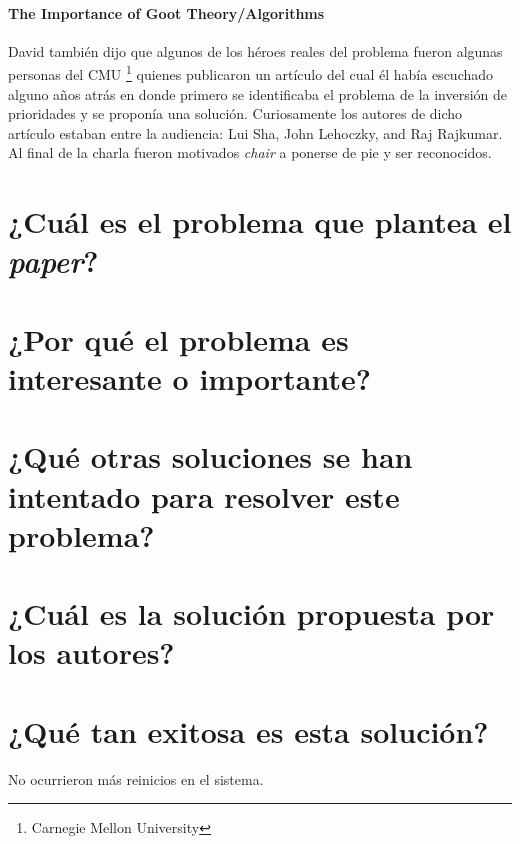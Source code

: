 \paragraph{\textnormal{\textbf{The Importance of Goot Theory/Algorithms}}}
David también dijo que algunos de los héroes reales del problema fueron algunas personas del CMU \footnote{Carnegie Mellon University} quienes publicaron un artículo del cual él había escuchado  alguno años atrás en donde primero se identificaba el problema de la inversión de prioridades y se proponía una solución. Curiosamente los autores de dicho artículo estaban entre la audiencia: Lui Sha, John Lehoczky, and Raj Rajkumar. Al final de la charla fueron motivados \textit{chair} a ponerse de pie y ser reconocidos.




\section{¿Cuál es el problema que plantea el \textit{paper}?}

\section{¿Por qué el problema es interesante o importante?}

\section{¿Qué otras soluciones se han intentado para resolver este problema?}
     
\section{¿Cuál es la solución propuesta por los autores?}

\section{¿Qué tan exitosa es esta solución?} 
No ocurrieron más reinicios en el sistema.